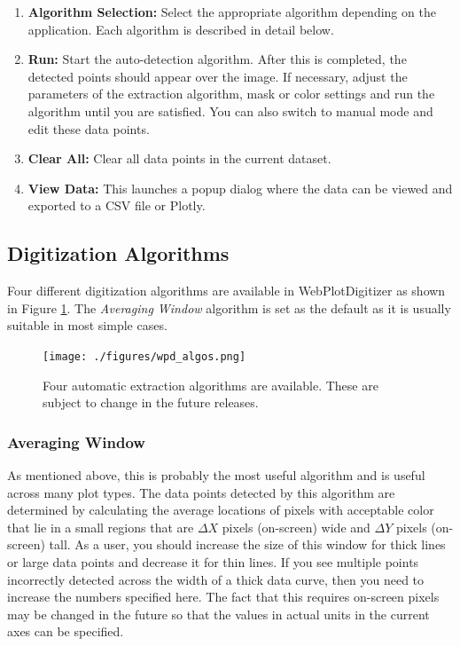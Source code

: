 \documentclass[letterpaper, 10pt]{article}
\begin{document}
\begin{enumerate}
\begin{enumerate}
\end{enumerate}
\item{{\bf Algorithm Selection: }Select the appropriate algorithm depending on the application. Each algorithm is described in detail below.}
\item{{\bf Run: }Start the auto-detection algorithm. After this is completed, the detected points should appear over the image. If necessary, adjust the parameters of the extraction algorithm, mask or color settings and run the algorithm until you are satisfied. You can also switch to manual mode and edit these data points.}
\item{{\bf Clear All: }Clear all data points in the current dataset.}
\item{{\bf View Data: }This launches a popup dialog where the data can be viewed and exported to a CSV file or Plotly.}
\end{enumerate}

\subsection{Digitization Algorithms}
Four different digitization algorithms are available in WebPlotDigitizer as shown in Figure \ref{fig:autoExtractAlgos}. The \emph{Averaging Window} algorithm is set as the default as it is usually suitable in most simple cases.
\begin{figure}
\begin{center}
\texttt{[image: ./figures/wpd\_algos.png]}
\caption{Four automatic extraction algorithms are available. These are subject to change in the future releases.}
\label{fig:autoExtractAlgos}
\end{center}
\end{figure}
\subsubsection{Averaging Window}
As mentioned above, this is probably the most useful algorithm and is useful across many plot types. The data points detected by this algorithm are determined by calculating the average locations of pixels with acceptable color that lie in a small regions that are $\Delta X$ pixels (on-screen) wide and $\Delta Y$ pixels (on-screen) tall. As a user, you should increase the size of this window for thick lines or large data points and decrease it for thin lines. If you see multiple points incorrectly detected across the width of a thick data curve, then you need to increase the numbers specified here. The fact that this requires on-screen pixels may be changed in the future so that the values in actual units in the current axes can be specified.
\end{document}
